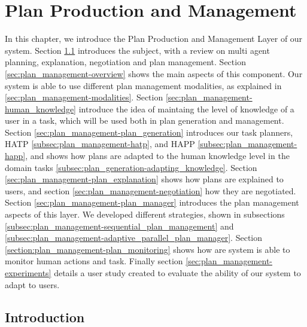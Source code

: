 
\chapter{Plan Production and Management} %

\label{chapter:plan_management} %

In this chapter, we introduce the Plan Production and Management Layer of our system. Section \ref{sec:plan_management-intro} introduces the subject, with a review on multi agent planning, explanation, negotiation and plan management. Section \ref{sec:plan_management-overview} shows the main aspects of this component. Our system is able to use different plan management modalities, as explained in \ref{sec:plan_management-modalities}. Section \ref{sec:plan_management-human_knowledge} introduce the idea of maintaing the level of knowledge of a user in a task, which will be used both in plan generation and management. Section \ref{sec:plan_management-plan_generation} introduces our task planners, HATP \ref{subsec:plan_management-hatp}, and HAPP \ref{subsec:plan_management-happ}, and shows how plans are adapted to the human knowledge level in the domain tasks \ref{subsec:plan_generation-adapting_knowledge}. Section \ref{sec:plan_management-plan_explanation} shows how plans are explained to users, and section \ref{sec:plan_management-negotiation} how they are negotiated.  Section \ref{sec:plan_management-plan_manager} introduces the plan management aspects of this layer. We developed different strategies, shown in subsections \ref{subsec:plan_management-sequential_plan_management} and \ref{subsec:plan_management-adaptive_parallel_plan_manager}. Section \ref{section:plan_management-plan_monitoring} shows how are system is able to monitor human actions and task. Finally section \ref{sec:plan_management-experiments} details a user study created to evaluate the ability of our system to adapt to users.


\section{Introduction}
\label{sec:plan_management-intro}
